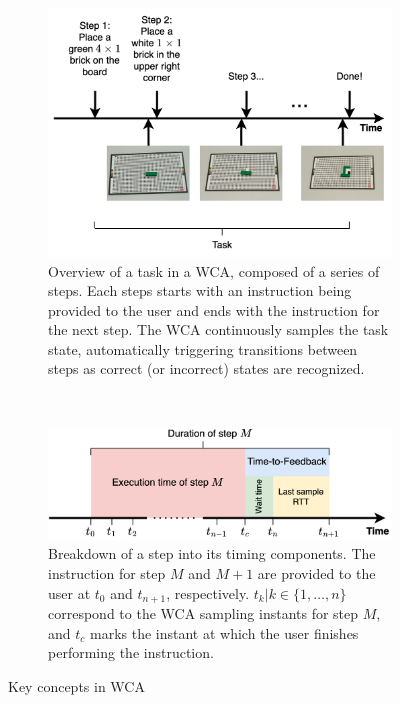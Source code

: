 \begin{figure}
    \centering
    \begin{subfigure}{\columnwidth}
        \centering
        \includegraphics[width=\columnwidth]{publications/2023EdgeDroid2/figs/task.png}
        \caption{%
            Overview of a task in a \gls{WCA}, composed of a series of steps.
            Each steps starts with an instruction being provided to the user and ends with the instruction for the next step.
            The \gls{WCA} continuously samples the task state, automatically triggering transitions between steps as correct (or incorrect) states are recognized.
        }\label{background:fig:wcatask}
    \end{subfigure}\\
    \begin{subfigure}{\columnwidth}
        \centering
        \includegraphics[width=\columnwidth]{publications/2023EdgeDroid2/figs/step_time.png}
        \caption{%
            Breakdown of a step into its timing components.
            The instruction for step \( M \) and \( M + 1 \) are provided to the user at \( t_0 \) and \( t_{n+1} \), respectively.
            \( t_k | k \in \{1, \ldots, n \} \) correspond to the \gls{WCA} sampling instants for step \( M \), and \( t_c \) marks the instant at which the user finishes performing the instruction.
        }\label{background:fig:wcastep}
    \end{subfigure}
    \caption{Key concepts in \gls{WCA}}
\end{figure}

